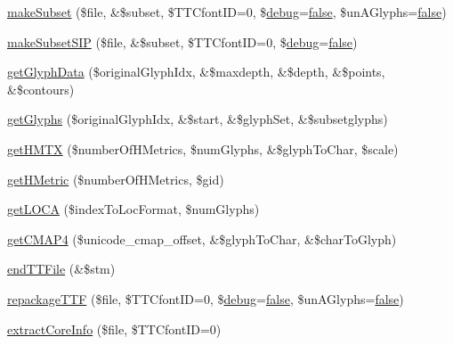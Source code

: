 \begin{DoxyCompactItemize}
\item 
\hyperlink{class_t_t_font_file_a56a93b130bff3ce4e66eae93a80dcc1e}{make\-Subset} (\$file, \&\$subset, \$T\-T\-Cfont\-I\-D=0, \$\hyperlink{font__dump_8php_a200a436f1833a712239f1ae5bec608db}{debug}=\hyperlink{ttfontsuni_8php_afbaa04e5cc97693dc668b3c45d3dd740}{false}, \$un\-A\-Glyphs=\hyperlink{ttfontsuni_8php_afbaa04e5cc97693dc668b3c45d3dd740}{false})
\item 
\hyperlink{class_t_t_font_file_a3ff79b50d17641ed83964d92d6ffd0ed}{make\-Subset\-S\-I\-P} (\$file, \&\$subset, \$T\-T\-Cfont\-I\-D=0, \$\hyperlink{font__dump_8php_a200a436f1833a712239f1ae5bec608db}{debug}=\hyperlink{ttfontsuni_8php_afbaa04e5cc97693dc668b3c45d3dd740}{false})
\item 
\hyperlink{class_t_t_font_file_a75490f61711c49c6d6ac571bb0204eac}{get\-Glyph\-Data} (\$original\-Glyph\-Idx, \&\$maxdepth, \&\$depth, \&\$points, \&\$contours)
\item 
\hyperlink{class_t_t_font_file_a70cb2635d2a52876a71697fd0d16ff6f}{get\-Glyphs} (\$original\-Glyph\-Idx, \&\$start, \&\$glyph\-Set, \&\$subsetglyphs)
\item 
\hyperlink{class_t_t_font_file_a0166bede7c8aa5c5e6b1f86b323e8bd8}{get\-H\-M\-T\-X} (\$number\-Of\-H\-Metrics, \$num\-Glyphs, \&\$glyph\-To\-Char, \$scale)
\item 
\hyperlink{class_t_t_font_file_aff60a4baa1e2194dd52f26a1154ee8fa}{get\-H\-Metric} (\$number\-Of\-H\-Metrics, \$gid)
\item 
\hyperlink{class_t_t_font_file_a2c18b1543e1019a23f3991396c0a98f8}{get\-L\-O\-C\-A} (\$index\-To\-Loc\-Format, \$num\-Glyphs)
\item 
\hyperlink{class_t_t_font_file_a98f073ef38b6d941b35981ef2437711c}{get\-C\-M\-A\-P4} (\$unicode\-\_\-cmap\-\_\-offset, \&\$glyph\-To\-Char, \&\$char\-To\-Glyph)
\item 
\hyperlink{class_t_t_font_file_af6ca853be4a1fd91599d1d276da49402}{end\-T\-T\-File} (\&\$stm)
\item 
\hyperlink{class_t_t_font_file_ab67caccbd898fbf40016916a73487b86}{repackage\-T\-T\-F} (\$file, \$T\-T\-Cfont\-I\-D=0, \$\hyperlink{font__dump_8php_a200a436f1833a712239f1ae5bec608db}{debug}=\hyperlink{ttfontsuni_8php_afbaa04e5cc97693dc668b3c45d3dd740}{false}, \$un\-A\-Glyphs=\hyperlink{ttfontsuni_8php_afbaa04e5cc97693dc668b3c45d3dd740}{false})
\item 
\hyperlink{class_t_t_font_file_a84a2aa45b746c06740e6c6adbaa9d093}{extract\-Core\-Info} (\$file, \$T\-T\-Cfont\-I\-D=0)
\end{DoxyCompactItemize}
